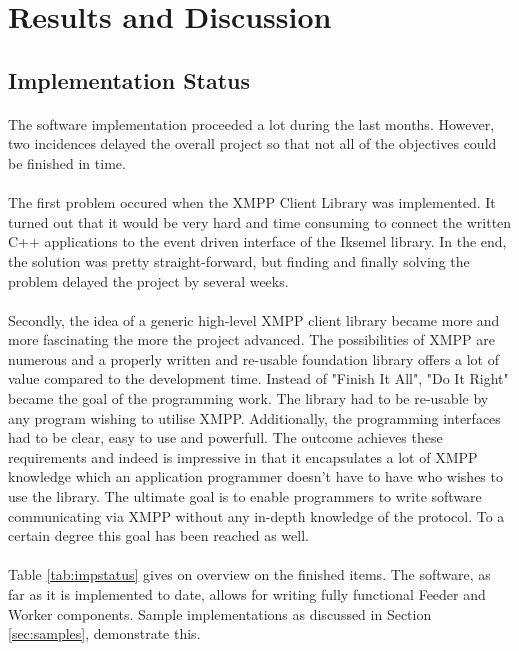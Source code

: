 \section{Results and Discussion}
\label{sec:discussion}

\subsection{Implementation Status}
\paragraph{}
The software implementation proceeded a lot during the last months. However, two incidences delayed the overall project so that not all of the objectives could be finished in time.

\paragraph{}
The first problem occured when the XMPP Client Library was implemented. It turned out that it would be very hard and time consuming to connect the written C++ applications to the event driven interface of the Iksemel library. In the end, the solution was pretty straight-forward, but finding and finally solving the problem delayed the project by several weeks.

\paragraph{}
Secondly, the idea of a generic high-level XMPP client library became more and more fascinating the more the project advanced. The possibilities of XMPP are numerous and a properly written and re-usable foundation library offers a lot of value compared to the development time. Instead of "Finish It All", "Do It Right" became the goal of the programming work. The library had to be re-usable by any program wishing to utilise XMPP. Additionally, the programming interfaces had to be clear, easy to use and powerfull. The outcome achieves these requirements and indeed is impressive in that it encapsulates a lot of XMPP knowledge which an application programmer doesn't have to have who wishes to use the library. The ultimate goal is to enable programmers to write software communicating via XMPP without any in-depth knowledge of the protocol. To a certain degree this goal has been reached as well.

\paragraph{}
Table \ref{tab:impstatus} gives on overview on the finished items. The software, as far as it is implemented to date, allows for writing fully functional Feeder and Worker components. Sample implementations as discussed in Section \ref{sec:samples}, demonstrate this.

